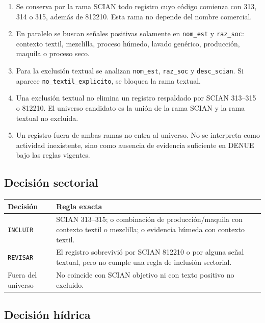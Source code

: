 \documentclass[11pt,letterpaper]{article}
\begin{document}
\begin{enumerate}[label=\arabic*.]
  \item Se conserva por la rama SCIAN todo registro cuyo c\'odigo comienza con 313, 314 o 315, adem\'as de 812210. Esta rama no depende del nombre comercial.
  \item En paralelo se buscan se\~nales positivas solamente en \texttt{nom\_est} y \texttt{raz\_soc}: contexto textil, mezclilla, proceso h\'umedo, lavado gen\'erico, producci\'on, maquila o proceso seco.
  \item Para la exclusi\'on textual se analizan \texttt{nom\_est}, \texttt{raz\_soc} y \texttt{desc\_scian}. Si aparece \texttt{no\_textil\_explicito}, se bloquea la rama textual.
  \item Una exclusi\'on textual no elimina un registro respaldado por SCIAN 313--315 o 812210. El universo candidato es la uni\'on de la rama SCIAN y la rama textual no excluida.
  \item Un registro fuera de ambas ramas no entra al universo. No se interpreta como actividad inexistente, sino como ausencia de evidencia suficiente en DENUE bajo las reglas vigentes.
\end{enumerate}

\subsection{Decisi\'on sectorial}

\begin{longtable}{p{}p{}}
\toprule
Decisi\'on & Regla exacta\\
\midrule
\endhead
\texttt{INCLUIR} & SCIAN 313--315; o combinaci\'on de producci\'on/maquila con contexto textil o mezclilla; o evidencia h\'umeda con contexto textil.\\
\texttt{REVISAR} & El registro sobrevivi\'o por SCIAN 812210 o por alguna se\~nal textual, pero no cumple una regla de inclusi\'on sectorial.\\
Fuera del universo & No coincide con SCIAN objetivo ni con texto positivo no excluido.\\
\bottomrule
\end{longtable}

\subsection{Decisi\'on h\'idrica}
\end{document}
